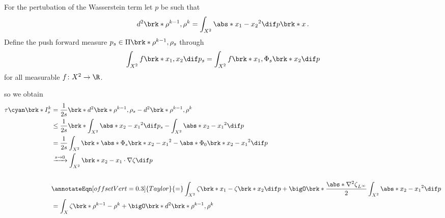 \begin{frame}
  \begin{proofs}
    For the pertubation of the Wasserstein term let $p$ be such that
    \begin{align*}
      d^2\brk*{\rho^{k-1},\rho^k}=\int_{X^2}\abs*{x_1-x_2}^2\dif p\brk*{x}\,.
    \end{align*}
    Define the push forward measure $p_s\in\Pi\brk*{\rho^{k-1},\rho_s}$ through
    \begin{align*}
      \int_{X^2}f\brk*{x_1,x_2}\dif p_s=\int_{X^2}f\brk*{x_1,\Phi_s\brk*{x_2}} \dif p
    \end{align*}
    for all measurable $f\colon X^2\to\R$.
  \end{proofs}
\end{frame}

\begin{frame}
  \begin{proofs}
    so we obtain
    \begin{align*}
      \tau{\cyan\brk*{I}^k_s}&=\frac{1}{2s}\brk*{d^2\brk*{\rho^{k-1},\rho_s}-d^2\brk*{\rho^{k-1},\rho^k}} \\
      &\leq \frac{1}{2s}\brk*{\int_{X^2}\abs*{x_2-x_1}^2\dif p_s-\int_{X^2}\abs*{x_2-x_1}^2\dif p} \\ %
      &= \frac{1}{2s}\int_{X^2}\brk*{\abs*{\Phi_s\brk*{x_2}-x_1}^2-\abs*{\Phi_0\brk*{x_2}-x_1}^2}\dif p \\
      &\xrightarrow{s\to0}\int_{X^2}\brk*{x_2-x_1}\cdot\nabla\zeta\dif p \\ \\
      &\annotateEqn[offsetVert=0.3]{Taylor}{=}\int_{X^2}\zeta\brk*{x_1}-\zeta\brk*{x_2}\dif p
      +\bigO\brk*{\frac{\abs*{\nabla^2\zeta}_{L^\infty}}{2}\int_{X^2}\abs*{x_2-x_1}^2\dif p} \\
      &=\int_{X}\zeta\brk*{\rho^{k-1}-\rho^k} +\bigO\brk*{d^2\brk*{\rho^{k-1},\rho^k}} \\
    \end{align*}
  \end{proofs}
\end{frame}


